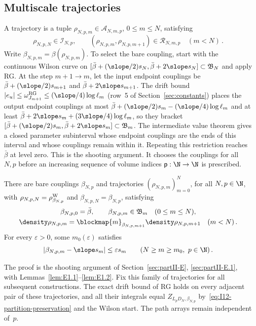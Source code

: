 \subsection{Multiscale trajectories}

A trajectory is a tuple $\rho_{N,p,m}\in\mathcal A_{N,m,p}$, $0\le m\le N$, satisfying
\begin{equation*}
\rho_{N,p,N}\in\mathcal I_{N,p},\qquad
(\rho_{N,p,m},\rho_{N,p,m+1})\in\mathcal R_{N,m,p}\quad(m<N)\,.
\end{equation*}
Write $\beta_{N,p,m}=\beta(\rho_{N,p,m})$. To select the bare coupling, start with the continuous Wilson curve on $[\bar\beta+(\slope/2)s_N,\bar\beta+2\slope s_N]\subset\mathfrak B_N$ and apply RG. At the step $m+1\to m$, let the input endpoint couplings be $\bar\beta+(\slope/2)s_{m+1}$ and $\bar\beta+2\slope s_{m+1}$. The drift bound $|e_u|\le\omega^{\rm RG}_{J_{m+1}}\le(\slope/4)\log\ell_m$ (row~5 of Section~\ref{sec:constants}) places the output endpoint couplings at most $\bar\beta+(\slope/2)s_m-(\slope/4)\log\ell_m$ and at least $\bar\beta+2\slope s_m+(3\slope/4)\log\ell_m$, so they bracket $[\bar\beta+(\slope/2)s_m,\bar\beta+2\slope s_m]\subset\mathfrak B_m$. The intermediate value theorem gives a closed parameter subinterval whose endpoint couplings are the ends of this interval and whose couplings remain within it. Repeating this restriction reaches $\bar\beta$ at level zero. This is the shooting argument. It chooses the couplings for all $N,p$ before an increasing sequence of volume indices $\mathsf p:\N\to\N$ is prescribed.

\begin{theorem}\label{prop:MT}
There are bare couplings $\beta_{N,p}$ and trajectories $(\rho_{N,p,m})_{m=0}^N$, for all $N,p\in\N$, with $\rho_{N,p,N}=\rho^{\rm W}_{\beta_{N,p}}$ and $\beta_{N,p,N}=\beta_{N,p}$, satisfying
\begin{gather*}
\beta_{N,p,0}=\bar\beta,\qquad \beta_{N,p,m}\in\mathfrak B_m\quad(0\le m\le N),\\
\density\rho_{N,p,m}=\blockmap{m}_{\beta_{N,p,m+1}}\density\rho_{N,p,m+1}\quad(m<N)\,.
\end{gather*}
For every $\varepsilon>0$, some $m_0(\varepsilon)$ satisfies
\begin{equation*}
|\beta_{N,p,m}-\slope s_m|\le\varepsilon s_m
\qquad(N\ge m\ge m_0,\ p\in\N)\,.
\end{equation*}
\end{theorem}

The proof is the shooting argument of Section~\ref{sec:partII-E}, \ref{sec:partII-E.1}, with Lemmas~\ref{lem:E1.1}--\ref{lem:E1.2}. Fix this family of trajectories for all subsequent constructions. The exact drift bound of RG holds on every adjacent pair of these trajectories, and all their integrals equal $Z_{L_pD_N,\beta_{N,p}}$ by~\eqref{eq:I12-partition-preservation} and the Wilson start. The path arrays remain independent of~$p$.

